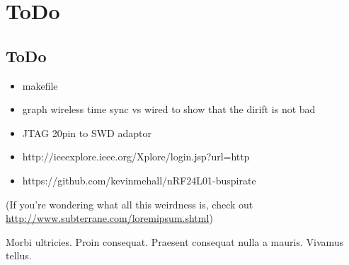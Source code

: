 \chapter{ToDo}

\section{ToDo}
\begin{itemize}
  \item makefile
  \item graph wireless time sync vs wired to show that the dirift is not bad
  \item JTAG 20pin to SWD adaptor
  \item http://ieeexplore.ieee.org/Xplore/login.jsp?url=http%
  \item https://github.com/kevinmehall/nRF24L01-buspirate
\end{itemize}

(If you're wondering what all this weirdness is, check out\\
\url{http://www.subterrane.com/loremipsum.shtml})

Morbi ultricies. Proin consequat. Praesent consequat nulla a mauris.
Vivamus tellus. 



